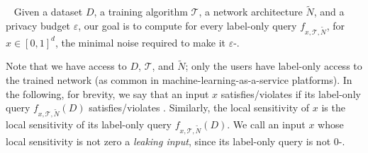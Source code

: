 \begin{definition}~\label{def:NN_local_sensitivity}
Given a dataset $D$, a training algorithm $\mathcal{T}$, a network architecture $\widetilde{N}$, and a privacy budget $\varepsilon$, our goal is to compute for every label-only query $f_{x,\mathcal{T},\widetilde{N}}$, for $x\in [0,1]^d$, the minimal noise required to make it $\varepsilon$-\propi. 
\end{definition} 
Note that we have access to $D$, $\mathcal{T}$, and $\widetilde{N}$; only the users have label-only access to the trained network (as common in machine-learning-as-a-service platforms).
In the following, for brevity,  
we say that an input $x$ satisfies/violates \propi if its label-only query $f_{x,\mathcal{T},\widetilde{N}}(D)$ satisfies/violates \propi. Similarly, the local sensitivity of $x$ is the local sensitivity of its label-only query $f_{x,\mathcal{T},\widetilde{N}}(D)$.
 We call an input $x$ whose local sensitivity is not zero a \emph{leaking input}, since its label-only query is not 0-\propi. %


